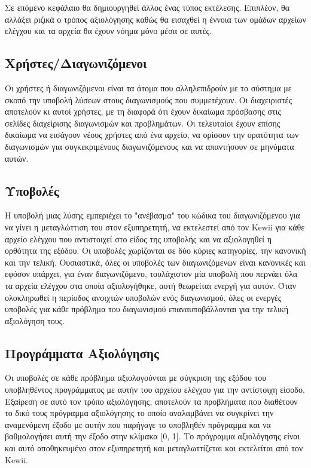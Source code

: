 \documentclass[diploma]{softlab-thesis}
\begin{document}
Σε επόμενο κεφάλαιο θα δημιουργηθεί άλλος ένας τύπος εκτέλεσης. Επιπλέον, θα
αλλάξει ριζικά ο τρόπος αξιολόγησης καθώς θα εισαχθεί η έννοια των ομάδων
αρχείων ελέγχου και τα αρχεία θα έχουν νόημα μόνο μέσα σε αυτές.


\subsection{Χρήστες/Διαγωνιζόμενοι}

Οι χρήστες ή διαγωνιζόμενοι είναι τα άτομα που αλληλεπιδρούν με το σύστημα με
σκοπό την υποβολή λύσεων στους διαγωνισμούς που συμμετέχουν. Οι διαχειριστές
αποτελούν κι αυτοί χρήστες, με τη διαφορά ότι έχουν δικαίωμα πρόσβασης στις
σελίδες διαχείρισης διαγωνισμών και προβλημάτων. Οι τελευταίοι έχουν επίσης
δικαίωμα να εισάγουν νέους χρήστες από ένα αρχείο, να ορίσουν την ορατότητα των
διαγωνισμών για συγκεκριμένους διαγωνιζόμενους και να απαντήσουν σε μηνύματα
αυτών.

\subsection{Υποβολές}

Η υποβολή μιας λύσης εμπεριέχει το "ανέβασμα" του κώδικα του διαγωνιζόμενου για
να γίνει η μεταγλώττιση του στον εξυπηρετητή, να εκτελεστεί από τον Kewii για
κάθε αρχείο ελέγχου που αντιστοιχεί στο είδος της υποβολής και να αξιολογηθεί η
ορθότητα της εξόδου. Οι υποβολές χωρίζονται σε δύο κύριες κατηγορίες, την
κανονική και την τελική. Ουσιαστικά, όλες οι υποβολές των διαγωνιζόμενων είναι
κανονικές και εφόσον υπάρχει, για έναν διαγωνιζόμενο, τουλάχιστον μία υποβολή
που περνάει όλα τα αρχεία ελέγχου στα οποία αξιολογήθηκε, αυτή θεωρείται ενεργή
για αυτόν. Όταν ολοκληρωθεί η περίοδος ανοιχτών υποβολών ενός διαγωνισμού, όλες
οι ενεργές υποβολές για κάθε πρόβλημα του διαγωνισμού επαναυποβάλλονται για την
τελική αξιολόγηση τους.

\subsection{Προγράμματα Αξιολόγησης}

Οι υποβολές σε κάθε πρόβλημα αξιολογούνται με σύγκριση της εξόδου του υποβληθέντος
προγράμματος με αυτήν του αρχείου ελέγχου για την αντίστοιχη είσοδο. Εξαίρεση σε
αυτό τον τρόπο αξιολόγησης, αποτελούν τα προβλήματα που διαθέτουν το δικό τους
πρόγραμμα αξιολόγησης το οποίο αναλαμβάνει να συγκρίνει την αναμενόμενη έξοδο
με αυτήν που παρήγαγε το υποβληθέν πρόγραμμα και να βαθμολογήσει αυτή την έξοδο
στην κλίμακα [0, 1]. Το πρόγραμμα αξιολόγησης είναι και αυτό αποθηκευμένο στον
εξυπηρετητή και μεταγλωττίζεται και εκτελείται από τον Kewii.
\end{document}
